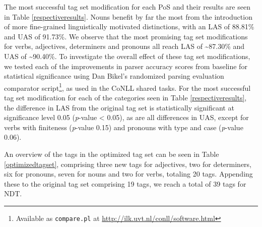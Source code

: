 \documentclass[11pt,a4paper]{article}
\begin{document}
The most successful tag set modification for each PoS and their results are
seen in Table \ref{respectiveresults}. Nouns benefit by far the most from the
introduction of more fine-grained linguistically motivated distinctions, with
an LAS of 88.81\% and UAS of 91.73\%. We observe that the most promising tag
set modifications for verbs, adjectives, determiners and pronouns all reach LAS
of \textasciitilde 87.30\% and UAS of \textasciitilde 90.40\%. To investigate
the overall effect of these tag set modifications, we tested each of the
improvements in parser accuracy scores from baseline for statistical
significance using Dan Bikel's randomized parsing evaluation comparator
script\footnote{Available as \texttt{compare.pl} at
    \url{http://ilk.uvt.nl/conll/software.html}}, as used in the CoNLL shared
tasks. For the most successful tag set modification for each of the categories
seen in Table \ref{respectiveresults}, the difference in LAS from the original
tag set is statistically significant at significance level 0.05 (\emph{p}-value
< 0.05), as are all differences in UAS, except for verbs with finiteness
(\emph{p}-value 0.15) and pronouns with type and case (\emph{p}-value 0.06).

An overview of the tags in the optimized tag set can be seen in Table
\ref{optimizedtagset}, comprising three new tags for adjectives, two for
determiners, six for pronouns, seven for nouns and two for verbs, totaling 20
tags. Appending these to the original tag set comprising 19 tags, we reach a
total of 39 tags for NDT.
\end{document}
